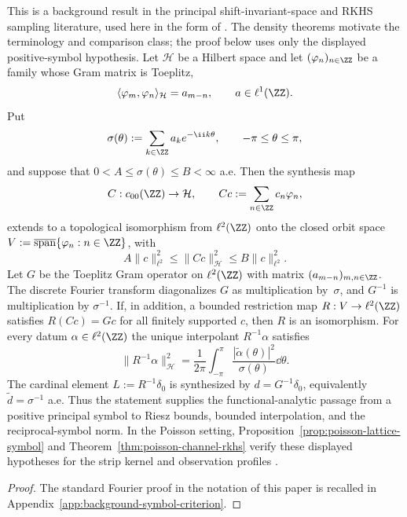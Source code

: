 \smallskip
\begin{lemma}%
\label{lem:imported-principal-symbol-sampling}
This is a background result in the principal shift-invariant-space and
RKHS sampling literature, used here in the form of
\cite{deBoorDeVoreRon1994,RonShen1995,Bownik2000,AldroubiGrochenig2001,NashedWalter1991,NashedSun2010,ChengJiangSun2016}.
The density theorems
\cite{Beurling1989,Landau1967,Seip1992,FuhrGrochenigHaimiKlotzRomero2018}
motivate the terminology and comparison class; the proof below uses only the
displayed positive-symbol hypothesis.
Let $\mathcal H$ be a Hilbert space and let
$(\varphi_n)_{n\in\ZZ}$ be a family whose Gram matrix is Toeplitz,
\[
\langle\varphi_m,\varphi_n\rangle_{\mathcal H}=a_{m-n},
\qquad a\in\ell^1(\ZZ).
\]
Put
\[
\sigma(\theta):=\sum_{k\in\ZZ}a_ke^{-\ii k\theta},
\qquad -\pi\le\theta\le\pi,
\]
and suppose that $0<A\le\sigma(\theta)\le B<\infty$ a.e.  Then the
synthesis map
\[
C:c_{00}(\ZZ)\to\mathcal H,
\qquad Cc:=\sum_{n\in\ZZ}c_n\varphi_n,
\]
extends to a topological isomorphism from $\ell^2(\ZZ)$ onto the closed
orbit space $V:=\overline{\operatorname{span}}\{\varphi_n:n\in\ZZ\}$, with
\[
A\|c\|_{\ell^2}^2\le\|Cc\|_{\mathcal H}^2
\le B\|c\|_{\ell^2}^2.
\]
Let $G$ be the Toeplitz Gram operator on $\ell^2(\ZZ)$ with matrix
$(a_{m-n})_{m,n\in\ZZ}$.  The discrete Fourier transform diagonalizes
$G$ as multiplication by~$\sigma$, and $G^{-1}$ is multiplication by
$\sigma^{-1}$.  If, in addition, a bounded restriction map
$R:V\to\ell^2(\ZZ)$ satisfies $R(Cc)=Gc$ for all finitely supported $c$,
then $R$ is an isomorphism.  For every datum $\alpha\in\ell^2(\ZZ)$ the
unique interpolant $R^{-1}\alpha$ satisfies
\begin{equation}\label{eq:imported-reciprocal-symbol-norm}
\|R^{-1}\alpha\|_{\mathcal H}^2
=\frac1{2\pi}\int_{-\pi}^{\pi}
\frac{|\widetilde\alpha(\theta)|^2}{\sigma(\theta)}\dd\theta .
\end{equation}
The cardinal element $L:=R^{-1}\delta_0$ is synthesized by
$d=G^{-1}\delta_0$, equivalently $\widetilde d=\sigma^{-1}$ a.e.
Thus the statement supplies the functional-analytic passage from a positive
principal symbol to Riesz bounds, bounded interpolation, and the
reciprocal-symbol norm.  In the Poisson setting,
Proposition~\ref{prop:poisson-lattice-symbol} and
Theorem~\ref{thm:poisson-channel-rkhs} verify these displayed hypotheses for
the strip kernel and observation profiles
\cite{deBoorDeVoreRon1994,RonShen1995,AldroubiGrochenig2001}.
\end{lemma}
\begin{proof}
The standard Fourier proof in the notation of this paper is recalled in
Appendix~\ref{app:background-symbol-criterion}.
\end{proof}

